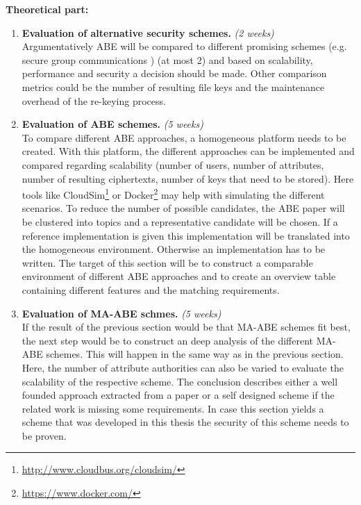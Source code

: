 \documentclass[twocolumn]{article}
\begin{document}
\noindent \textbf{Theoretical part:}
\begin{enumerate}
	\item\textbf{Evaluation of alternative security schemes.} \textit{(2 weeks)} \\
		  Argumentatively ABE will be compared to different promising schemes (e.g. secure group communications \cite{wong2000secure}) (at most 2) and based on scalability, performance and security a decision should be made. 
		  Other comparison metrics could be the number of resulting file keys and the maintenance overhead of the re-keying process. 
	\item\textbf{Evaluation of ABE schemes.} \textit{(5 weeks)} \\
		  To compare different ABE approaches, a homogeneous platform needs to be created. With this platform, the different approaches can be implemented and compared regarding scalability (number of users, number of attributes, number of resulting ciphertexts, number of keys that need to be stored). Here tools like CloudSim\footnote{\url{http://www.cloudbus.org/cloudsim/}} or Docker\footnote{\url{https://www.docker.com/}} may help with simulating the different scenarios. To reduce the number of possible candidates, the ABE paper will be clustered into topics and a representative candidate will be chosen. If a reference implementation is given this implementation will be translated into the homogeneous environment. Otherwise an implementation has to be written. 
		  The target of this section will be to construct a comparable environment of different ABE approaches and to create an overview table containing different features and the matching requirements.

	\item\textbf{Evaluation of MA-ABE schmes.} \textit{(5 weeks)} \\  
		  If the result of the previous section would be that MA-ABE schemes fit best, the next step would be to construct an deep analysis of the different MA-ABE schemes. This will happen in the same way as in the previous section. Here, the number of attribute authorities can also be varied to evaluate the scalability of the respective scheme. 
		  The conclusion describes either a well founded approach extracted from a paper or a self designed scheme if the related work is missing some requirements. In case this section yields a scheme that was developed in this thesis the security of this scheme needs to be proven.  
\end{enumerate}
\end{document}
